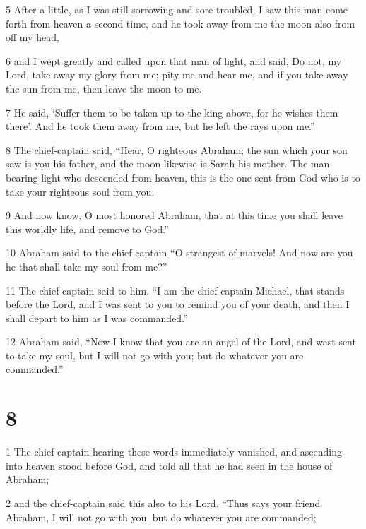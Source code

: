 \par 5 After a little, as I was still sorrowing and sore troubled, I saw this man come forth from heaven a second time, and he took away from me the moon also from off my head, 

\par 6 and I wept greatly and called upon that man of light, and said, Do not, my Lord, take away my glory from me; pity me and hear me, and if you take away the sun from me, then leave the moon to me. 

\par 7 He said, ‘Suffer them to be taken up to the king above, for he wishes them there’. And he took them away from me, but he left the rays upon me.” 

\par 8 The chief-captain said, “Hear, O righteous Abraham; the sun which your son saw is you his father, and the moon likewise is Sarah his mother. The man bearing light who descended from heaven, this is the one sent from God who is to take your righteous soul from you. 

\par 9 And now know, O most honored Abraham, that at this time you shall leave this worldly life, and remove to God.” 

\par 10 Abraham said to the chief captain “O strangest of marvels! And now are you he that shall take my soul from me?” 

\par 11 The chief-captain said to him, “I am the chief-captain Michael, that stands before the Lord, and I was sent to you to remind you of your death, and then I shall depart to him as I was commanded.” 

\par 12 Abraham said, “Now I know that you are an angel of the Lord, and wast sent to take my soul, but I will not go with you; but do whatever you are commanded.”

\chapter{8}

\par 1 The chief-captain hearing these words immediately vanished, and ascending into heaven stood before God, and told all that he had seen in the house of Abraham; 

\par 2 and the chief-captain said this also to his Lord, “Thus says your friend Abraham, I will not go with you, but do whatever you are commanded; 

